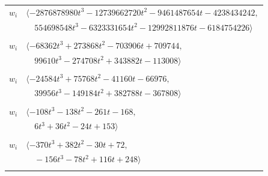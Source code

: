 \documentclass[11pt]{article}
\begin{document}
\begin{longtable}{@{}ll@{}}
$w_i$ & $\langle -2876878980t^{3}-12739662720t^{2}-9461487654t-4238434242,$\\
 & $\quad 554698548t^{3}-6323331654t^{2}-12992811876t-6184754226\rangle$\\
\addlinespace[2pt]
\multicolumn{2}{@{}p{0.97\textwidth}@{}}{$i=41$, $D_i=1$, $\rho_{ij}$: $3{:}2, \allowbreak 4{:}2, \allowbreak 7{:}1, \allowbreak 14{:}1, \allowbreak 16{:}1, \allowbreak 17{:}2, \allowbreak 25{:}2, \allowbreak 30{:}2, \allowbreak 43{:}2, \allowbreak 52{:}2, \allowbreak 55{:}1, \allowbreak 64{:}1, \allowbreak 67{:}2, \allowbreak 70{:}1, \allowbreak 90{:}2$}\\
$w_i$ & $\langle -68362t^{3}+273868t^{2}-703906t+709744,$\\
 & $\quad 99610t^{3}-274708t^{2}+343882t-113008\rangle$\\
\addlinespace[2pt]
\multicolumn{2}{@{}p{0.97\textwidth}@{}}{$i=42$, $D_i=1$, $\rho_{ij}$: $3{:}1, \allowbreak 4{:}1, \allowbreak 8{:}1, \allowbreak 12{:}2, \allowbreak 16{:}1, \allowbreak 17{:}2, \allowbreak 31{:}1, \allowbreak 48{:}1, \allowbreak 53{:}1, \allowbreak 55{:}2, \allowbreak 66{:}2, \allowbreak 72{:}2, \allowbreak 79{:}1, \allowbreak 85{:}1, \allowbreak 97{:}2$}\\
$w_i$ & $\langle -24584t^{3}+75768t^{2}-41160t-66976,$\\
 & $\quad 39956t^{3}-149184t^{2}+382788t-367808\rangle$\\
\addlinespace[2pt]
\multicolumn{2}{@{}p{0.97\textwidth}@{}}{$i=43$, $D_i=1$, $\rho_{ij}$: $1{:}2, \allowbreak 3{:}2, \allowbreak 5{:}2, \allowbreak 7{:}2, \allowbreak 18{:}1, \allowbreak 20{:}1, \allowbreak 21{:}1, \allowbreak 25{:}1, \allowbreak 30{:}2, \allowbreak 31{:}2, \allowbreak 37{:}1, \allowbreak 41{:}1$}\\
$w_i$ & $\langle -108t^{3}-138t^{2}-261t-168,$\\
 & $\quad 6t^{3}+36t^{2}-24t+153\rangle$\\
\addlinespace[2pt]
\multicolumn{2}{@{}p{0.97\textwidth}@{}}{$i=44$, $D_i=1$, $\rho_{ij}$: $0{:}2, \allowbreak 1{:}2, \allowbreak 6{:}2, \allowbreak 9{:}1, \allowbreak 21{:}2, \allowbreak 40{:}1, \allowbreak 55{:}2, \allowbreak 62{:}1, \allowbreak 64{:}2$}\\
$w_i$ & $\langle -370t^{3}+382t^{2}-30t+72,$\\
 & $\quad -156t^{3}-78t^{2}+116t+248\rangle$\\
\addlinespace[2pt]
\multicolumn{2}{@{}p{0.97\textwidth}@{}}{$i=45$, $D_i=1$, $\rho_{ij}$: $12{:}2, \allowbreak 31{:}1$}\\

\end{longtable}
\end{document}

